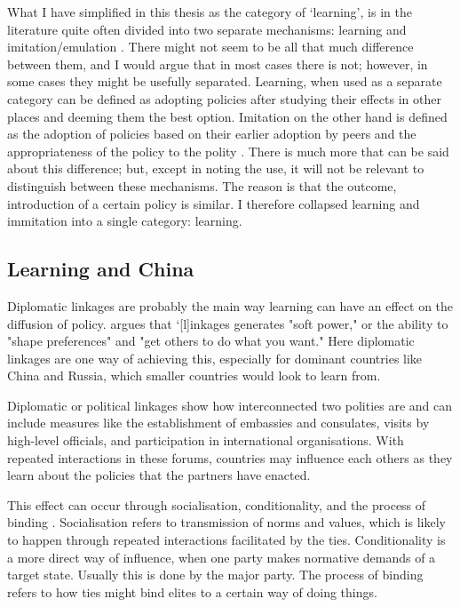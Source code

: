 What I have simplified in this thesis as the category of `learning', is in the literature quite often divided into two separate mechanisms: learning and imitation/emulation \citep{ elkins_waves_2005, gilardi_four_2016, shipan_mechanisms_2008}. There might not seem to be all that much difference between them, and I would argue that in most cases there is not; however, in some cases they might be usefully separated. Learning, when used as a separate category can be defined as adopting policies after studying their effects in other places and deeming them the best option. Imitation on the other hand is defined as the adoption of policies based on their earlier adoption by peers and the appropriateness of the policy to the polity \citep[pp. 799-801]{simmons_introduction_2006}. There is much more that can be said about this difference; but, except in noting the use, it will not be relevant to distinguish between these mechanisms. The reason is that the outcome, introduction of a certain policy is similar. I therefore collapsed learning and immitation into a single category: learning. 

\subsection{Learning and China}

Diplomatic linkages are probably the main way learning can have an effect on the diffusion of policy. \citet[p. 385]{levitsky_linkage_2006} argues that `[l]inkages generates "soft power," or the ability to "shape preferences" and "get others to do what you want." Here diplomatic linkages are one way of achieving this, especially for dominant countries like China and Russia, which smaller countries would look to learn from.

Diplomatic or political linkages show how interconnected two polities are and can include measures like the establishment of embassies and consulates, visits by high-level officials, and participation in international organisations. With repeated interactions in these forums, countries may influence each others as they learn about the policies that the partners have enacted. 

This effect can occur through socialisation, conditionality, and the process of binding \citep[pp. 1323-1326]{ambrosio_catching_2008}. Socialisation refers to transmission of norms and values, which is likely to happen through repeated interactions facilitated by the ties. Conditionality is a more direct way of influence, when one party makes normative demands of a target state. Usually this is done by the major party. The process of binding refers to how ties might bind elites to a certain way of doing things.

